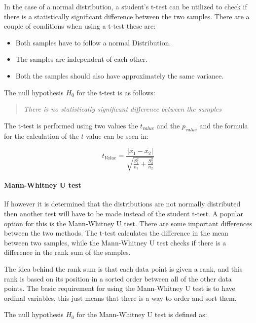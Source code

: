 In the case of a normal distribution, a student's t-test can be utilized to check if there is a statistically significant difference between the two samples. There are a couple of conditions when using a t-test these are:

\begin{itemize}
    \item Both samples have to follow a normal Distribution.
    \item The samples are independent of each other.
    \item Both the samples should also have approximately the same variance.
\end{itemize}

The null hypothesis $H_0$ for the t-test is as follows:

\begin{quote}
    \textit{There is no statistically significant difference between the samples}    
\end{quote}

The t-test is performed using two values the $t_{value}$ and the $p_{value}$ and the formula for the calculation of the $t$ value can be seen in:

\begin{equation}
    t_{Value} = \frac{|\bar{x_1}- \bar{x_2}|}{\sqrt{\frac{S_1^2}{n_1} + \frac{S_2^2}{n_2}}}  
\end{equation}

\paragraph{Mann-Whitney U test}
If however it is determined that the distributions are not normally distributed then another test will have to be made instead of the student t-test. A popular option for this is the Mann-Whitney U test. There are some important differences between the two methods. The t-test calculates the difference in the mean between two samples, while the Mann-Whitney U test checks if there is a difference in the rank sum of the samples\cite{mann1947test}. 

The idea behind the rank sum is that each data point is given a rank, and this rank is based on its position in a sorted order between all of the other data points. 
The basic requirement for using the Mann-Whitney U test is to have ordinal variables, this just means that there is a way to order and sort them.

The null hypothesis $H_0$ for the Mann-Whitney U test is defined as:

